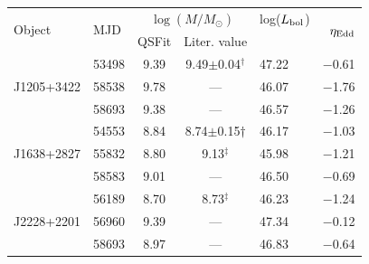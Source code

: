 \documentclass[fleqn,usenatbib]{mnras}
\begin{document}
\begin{table}
  \centering
  \begin{tabular}{l l  cc    l     r}
    \hline
    \hline
\multirow{2}{*}{Object} & \multirow{2}{*}{MJD} & \multicolumn{2}{c}{$\log (M/M_{\odot})$} & log($L_{\rm bol}$) &  \multirow{2}{*}{$\eta_{\rm Edd}$}  \\
                                    &                                  &    QSFit               &   Liter. value               &                             &    \\
    \hline
                                    & 53498                        &    9.39                &  9.49$\pm$0.04$^{\dagger}$   &   47.22                  &  $-$0.61   \\
 J1205+3422               & 58538                         &    9.78               &   ---                                        &  46.07                  &   $-$1.76 \\  %
                                    & 58693                        &    9.38               &   ---                                               &  46.57                &  $-$1.26  \\                    
    \hline 
                                    & 54553                        &   8.84                &  8.74$\pm$0.15$\dagger$                     & 46.17   & $-$1.03  \\
J1638+2827                 & 55832                       &    8.80                &    9.13$^{\ddagger}$                                         & 45.98   & $-$1.21  \\      %
                                    & 58583                        &   9.01                &  ---                         & 46.50   & $-$0.69   \\
    \hline 
                                     & 56189                       & 8.70                 & 8.73$^{\ddagger}$                         & 46.23  &  $-$1.24 \\
J2228+2201                 & 56960                       &  9.39                &   ---                       & 47.34  & $-$0.12  \\      %
                                     & 58693                      &  8.97                    &    ---                      & 46.83   &  $-$0.64 \\
    \hline
    \hline
  \end{tabular}

\end{table}
\end{document}
